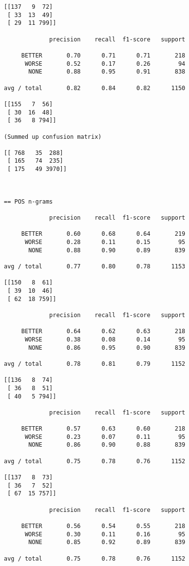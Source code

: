 \begin{appendices}
\begin{verbatim}
[[137   9  72]
 [ 33  13  49]
 [ 29  11 799]]
 
             precision    recall  f1-score   support

     BETTER       0.70      0.71      0.71       218
      WORSE       0.52      0.17      0.26        94
       NONE       0.88      0.95      0.91       838

avg / total       0.82      0.84      0.82      1150

[[155   7  56]
 [ 30  16  48]
 [ 36   8 794]]
 
(Summed up confusion matrix)

[[ 768   35  288]
 [ 165   74  235]
 [ 175   49 3970]]



== POS n-grams

             precision    recall  f1-score   support

     BETTER       0.60      0.68      0.64       219
      WORSE       0.28      0.11      0.15        95
       NONE       0.88      0.90      0.89       839

avg / total       0.77      0.80      0.78      1153

[[150   8  61]
 [ 39  10  46]
 [ 62  18 759]]
 
             precision    recall  f1-score   support

     BETTER       0.64      0.62      0.63       218
      WORSE       0.38      0.08      0.14        95
       NONE       0.86      0.95      0.90       839

avg / total       0.78      0.81      0.79      1152

[[136   8  74]
 [ 36   8  51]
 [ 40   5 794]]
 
             precision    recall  f1-score   support

     BETTER       0.57      0.63      0.60       218
      WORSE       0.23      0.07      0.11        95
       NONE       0.86      0.90      0.88       839

avg / total       0.75      0.78      0.76      1152

[[137   8  73]
 [ 36   7  52]
 [ 67  15 757]]
 
             precision    recall  f1-score   support

     BETTER       0.56      0.54      0.55       218
      WORSE       0.30      0.11      0.16        95
       NONE       0.85      0.92      0.89       839

avg / total       0.75      0.78      0.76      1152


\end{verbatim}
\end{appendices}
